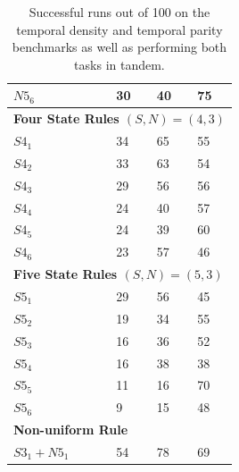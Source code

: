 \documentclass{elsarticle}
\begin{document}
\begin{multicols}{2}
\begin{table}[H]
\begin{tabular}{|l|l|l|l|}
			$N5_{6}$       & 30                & 40          & 75          \\ \hline
			\multicolumn{4}{|l|}{\textbf{Four State Rules \boldmath$(S,N) = (4,3)$}} \\ 
			\hline
			$S4_{1}$       & 34                & 65          & 55          \\ \hline
			$S4_{2}$       & 33                & 63          & 54          \\ \hline
			$S4_{3}$       & 29                & 56          & 56          \\ \hline
			$S4_{4}$       & 24                & 40          & 57          \\ \hline
			$S4_{5}$       & 24                & 39          & 60          \\ \hline
			$S4_{6}$       & 23                & 57          & 46          \\ \hline
			\multicolumn{4}{|l|}{\textbf{Five State Rules \boldmath$(S,N) = (5,3)$}} \\ 
			\hline
			$S5_{1}$       & 29                & 56          & 45          \\ \hline
			$S5_{2}$       & 19                & 34          & 55          \\ \hline
			$S5_{3}$       & 16                & 36          & 52          \\ \hline
			$S5_{4}$       & 16                & 38          & 38          \\ \hline
			$S5_{5}$       & 11                & 16          & 70          \\ \hline
			$S5_{6}$       & 9                 & 15          & 48          \\ \hline
			\multicolumn{4}{|l|}{\textbf{Non-uniform Rule}} \\ \hline
			$S3_1 +  N5_1$ & 54                & 78          & 69          \\ \hline
		\end{tabular}
		\caption{Successful runs out of 100 on the temporal density and temporal parity 
			benchmarks as well as performing both tasks in tandem.
		}
		\label{table:results_temp_dens}
	\end{table}
	

\end{multicols}
\end{document}
